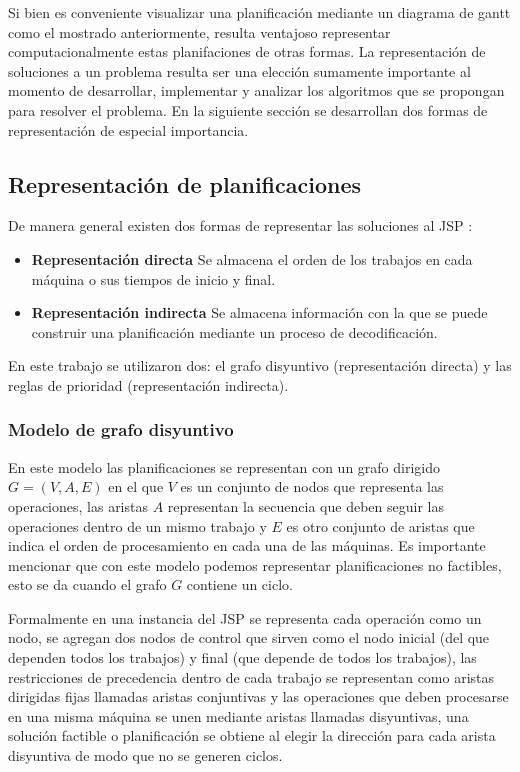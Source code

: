 Si bien es conveniente visualizar una planificación mediante un diagrama de gantt como el mostrado anteriormente, resulta ventajoso representar computacionalmente estas planifaciones de otras formas. La representación de soluciones a un problema resulta ser una elección sumamente importante al momento de desarrollar, implementar y analizar los algoritmos que se propongan para resolver el problema\cite{rothlauf2002representations}. En la siguiente sección se desarrollan dos formas de representación de especial importancia.

\subsection{Representación de planificaciones}
De manera general existen dos formas de representar las soluciones al JSP \cite{Cheng1996}:
\begin{itemize}
    \item \textbf{Representación directa} Se almacena el orden de los trabajos en cada máquina o sus tiempos de inicio y final.
    \item \textbf{Representación indirecta} Se almacena información con la que se puede construir una planificación mediante un proceso de decodificación.
\end{itemize}
En este trabajo se utilizaron dos: el grafo disyuntivo (representación directa) y las reglas de prioridad (representación indirecta).
\subsubsection*{Modelo de grafo disyuntivo} 
En este modelo las planificaciones se representan con un grafo dirigido $G=(V,A,E)$ en el que $V$ es un conjunto de nodos que representa las operaciones, las aristas $A$ representan la secuencia que deben seguir las operaciones dentro de un mismo trabajo y $E$ es otro conjunto de aristas que indica el orden de procesamiento en cada una de las máquinas. Es importante mencionar que con este modelo podemos representar planificaciones no factibles, esto se da cuando el grafo $G$ contiene un ciclo.


Formalmente en una instancia del JSP se representa cada operación como un nodo, se agregan dos nodos de control que sirven como el nodo inicial (del que dependen todos los trabajos) y final (que depende de todos los trabajos), las restricciones de precedencia dentro de cada trabajo se representan como aristas dirigidas fijas llamadas aristas conjuntivas y las operaciones que deben procesarse en una misma máquina se unen mediante aristas llamadas disyuntivas, una solución factible o planificación se obtiene al elegir la dirección para cada arista disyuntiva de modo que no se generen ciclos.   

